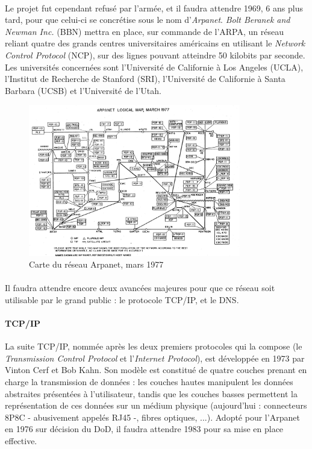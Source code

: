 \paragraph{} Le projet fut cependant refusé par l'armée, et il faudra attendre 1969, 6 ans plus tard, pour que celui-ci
se concrétise sous le nom d'\emph{Arpanet}. \emph{Bolt Beranek and Newman Inc.} (BBN) mettra en place, sur commande de
l'ARPA, un réseau reliant quatre des grands centres universitaires américains en utilisant le \emph{Network Control Protocol}
(NCP), sur des lignes pouvant atteindre 50 kilobits par seconde. Les universités concernées sont l'Université de Californie
à Los Angeles (UCLA), l'Institut de Recherche de Stanford (SRI), l'Université de Californie à Santa Barbara (UCSB) et
l'Université de l'Utah.

\begin{figure}[h]
    \centering
    \includegraphics[width=350px]{chapters/01/images/arpanet_map.jpg}
    \caption{\label{arpanet} Carte du réseau Arpanet, mars 1977}
\end{figure}

\paragraph{} Il faudra attendre encore deux avancées majeures pour que ce réseau soit utilisable par le grand public :
le protocole TCP/IP, et le DNS.

\paragraph{TCP/IP} La suite TCP/IP, nommée après les deux premiers protocoles qui la compose (le \emph{Transmission Control
Protocol} et l'\emph{Internet Protocol}), est développée en 1973 par Vinton Cerf et Bob Kahn. Son modèle est constitué de
quatre couches prenant en charge la transmission de données : les couches hautes manipulent les données abstraites
présentées à l'utilisateur, tandis que les couches basses permettent la représentation de ces données sur un médium
physique (aujourd'hui : connecteurs 8P8C - abusivement appelés RJ45 -, fibres optiques, ...). Adopté pour l'Arpanet en
1976 sur décision du DoD, il faudra attendre 1983 pour sa mise en place effective.

